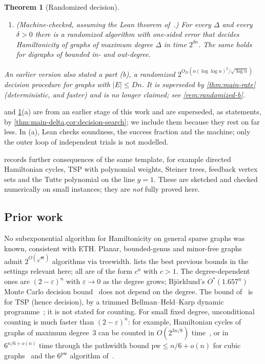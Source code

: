 \documentclass[11pt]{amsart}
\theoremstyle{plain}
\newtheorem{theorem}{Theorem}[section]
\theoremstyle{definition}
\theoremstyle{remark}
\numberwithin{equation}{section}
\begin{document}
\begin{theorem}[Randomized decision]\label{thm:randomized}
\leavevmode
\begin{enumerate}[label=\textup{(\alph*)}]
\item \textup{(Machine-checked, assuming the Lean theorem of~\cite{OpenAI26}.)} For every
$\Delta$ and every $\delta>0$ there is a randomized algorithm with one-sided error that decides
Hamiltonicity of graphs of maximum degree $\Delta$ in time $2^{\delta n}$. The same holds for
digraphs of bounded in- and out-degree.
\end{enumerate}
An earlier version also stated a part (b), a randomized $2^{O_D(n(\log\log n)^2/\sqrt{\log n})}$
decision procedure for graphs with $|E|\le Dn$. It is superseded by \cref{thm:main-rate}
(deterministic, and faster) and is no longer claimed; see \cref{rem:randomized-b}.
\end{theorem}

 and \cref{thm:randomized}(a) are from an earlier stage of this work and are
superseded, as statements, by \cref{thm:main-delta,cor:decision-search}; we include them because
they rest on far less. In (a), Lean checks soundness, the success fraction and the machine; only
the outer loop of independent trials is not modelled.

 records further consequences of the same template, for example directed
Hamiltonian cycles, TSP with polynomial weights, Steiner trees, feedback vertex sets and the
Tutte polynomial on the line $y=1$. These are sketched and checked numerically on small
instances; they are \emph{not} fully proved here.

\subsection{Prior work}
No subexponential algorithm for Hamiltonicity on general sparse graphs was known, consistent with
ETH. Planar, bounded-genus and minor-free graphs admit $2^{O(\sqrt n)}$ algorithms via treewidth.
 lists the best previous bounds in the settings relevant here; all are of the form
$c^n$ with $c>1$. The degree-dependent ones are $(2-\varepsilon)^n$ with $\varepsilon\to0$ as the
degree grows; Björklund's $O^*(1.657^n)$ Monte Carlo decision bound~\cite{Bjorklund14} does not
depend on the degree. The bound of~\cite{BHKK12} is for TSP (hence decision), by a trimmed
Bellman--Held--Karp dynamic programme~\cite{Bellman62,HeldKarp62}; it is not stated for
counting. For small fixed degree, unconditional counting is much faster than
$(2-\varepsilon)^n$: for example, Hamiltonian cycles of graphs of maximum degree~$3$ can be
counted in $O(2^{3n/8})$ time~\cite{Eppstein07}, or in $6^{n/6+o(n)}$ time through the pathwidth
bound $\mathrm{pw}\le n/6+o(n)$ for cubic graphs~\cite{FominHoie06} and the $6^{\mathrm{pw}}$
algorithm of~\cite{BCKN15}.
\end{document}
